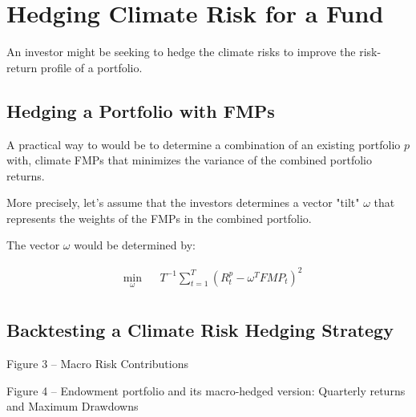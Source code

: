 \chapter{Hedging Climate Risk 
for a Fund}

An investor might be seeking to hedge 
the climate risks to improve 
the risk-return profile of a portfolio.

\section{Hedging a Portfolio with FMPs}

A practical way to would be to determine 
a combination of an existing portfolio $p$ with,
climate FMPs that minimizes the variance of 
the combined portfolio returns.

More precisely, let's assume that the 
investors determines a vector "tilt" 
$\omega$ that represents the weights of
the FMPs in the combined portfolio.

The vector $\omega$ would be determined by:

\begin{equation}
    \begin{aligned}
        & \underset{\omega}{\min}
        & &   T^{-1} \sum^T_{t=1} (R^p_t - \omega^T FMP_t)^2\\
    \end{aligned}
\end{equation}


\section{Backtesting a Climate Risk Hedging Strategy}

Figure 3 – Macro Risk Contributions

Figure 4 – Endowment portfolio and its macro-hedged version:
Quarterly returns and Maximum Drawdowns